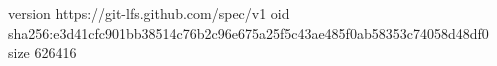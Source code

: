 version https://git-lfs.github.com/spec/v1
oid sha256:e3d41cfc901bb38514c76b2c96e675a25f5c43ae485f0ab58353c74058d48df0
size 626416
